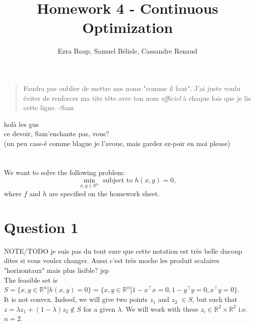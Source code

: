 \documentclass{article}
\title{Homework 4 - Continuous Optimization}
\author{\xcancel{Estelle} Ezra Baup, Samuel Bélisle, Cassandre Renaud }
\newcommand{\R}{\mathbb{R}}
\newcommand{\tp}{^\top}
\begin{document}
\maketitle

\begin{quote}
Faudra pas oublier de mettre nos noms "comme il faut". J'ai juste voulu éviter de renforcer ma tite tête avec ton nom \textit{officiel} à chaque fois que  je lis cette ligne.
\flushright -Sam
\end{quote}
holà les gus \\
ce devoir, Sam'enchante pas, vous?\\
(un peu cass-é comme blague je l'avoue, mais gardez ez-poir en moi please)\\\\\\

We want to solve the following problem:
\begin{equation*} \tag{P}\label{P}
\min_{x,y\in\R^n} \text{ subject to } h(x,y)=0,
\end{equation*}
where $f$ and $h$ are specified on the homework sheet.

\section*{Question 1}

NOTE/TODO je suis pas du tout sure que cette notation est très belle ducoup dites si vous voulez changer. Aussi c'est très moche les produit scalaires "horizontaux" mais plus lisible? jsp\\

The feasible set is $S=\{x,y \in \R^n | h(x,y)=0\}=\{x,y \in \R^n | 1-x\tp x=0, 1-y\tp y=0, x\tp y=0 \}$. \\
It is not convex. Indeed, we will give two points $z_1$ and $z_2$ $\in S$, but such that $z=\lambda z_1 + (1-\lambda) z_2 \notin S$ for a given $\lambda$. We will work with these $z_i \in \R^2 \times \R^2$ i.e. $n=2$.\\
\end{document}

